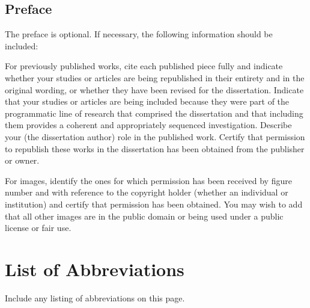 \documentclass[12pt,oneside, letterpaper]{book}
\begin{document}
\newpage
\begin{doublespace}
\chapter*{Preface}
\par The preface is optional. If necessary, the following information should be included:
\par For previously published works, cite each published piece fully and indicate whether your studies or articles are being republished in their entirety and in the original wording, or whether they have been revised for the dissertation. Indicate that your studies or articles are being included because they were part of the programmatic line of research that comprised the dissertation and that including them provides a coherent and appropriately sequenced investigation. Describe your (the dissertation author) role in the published work. Certify that permission to republish these works in the dissertation has been obtained from the publisher or owner. 
\par For images, identify the ones for which permission has been received by figure number and with reference to the copyright holder (whether an individual or institution) and certify that permission has been obtained. You may wish to add that all other images are in the public domain or being used under a public license or fair use. 
\end{doublespace}
\newpage

\tableofcontents
\listoftables
{}

\listoffigures
{}

\chapter*{List of Abbreviations}
Include any listing of abbreviations on this page.

\mainmatter
{}
\end{document}
